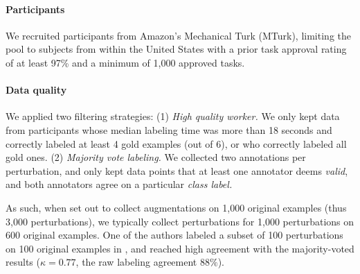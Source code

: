 \paragraph{Participants}
We recruited participants from Amazon's Mechanical Turk (MTurk), limiting the pool to subjects from within the United States with a prior task approval rating of at least 97\% and a minimum of 1,000 approved tasks.

\paragraph{Data quality}
We applied two filtering strategies: 
(1) \emph{High quality worker.} 
We only kept data from participants whose median labeling time was more than 18 seconds and correctly labeled at least 4 gold examples (out of 6), or who correctly labeled all gold ones.
(2) \emph{Majority vote labeling.}
We collected two annotations per perturbation, and only kept data points that at least one annotator deems \emph{valid}, and both annotators agree on a particular \emph{class label.}

As such, when set out to collect augmentations on 1,000 original examples (thus 3,000 perturbations), we typically collect perturbations for 1,000 perturbations on 600 original examples.
One of the authors labeled a subset of 100 perturbations on 100 original examples in \sst, and reached high agreement with the majority-voted results ($\kappa=0.77$, the raw labeling agreement $88\%$).
